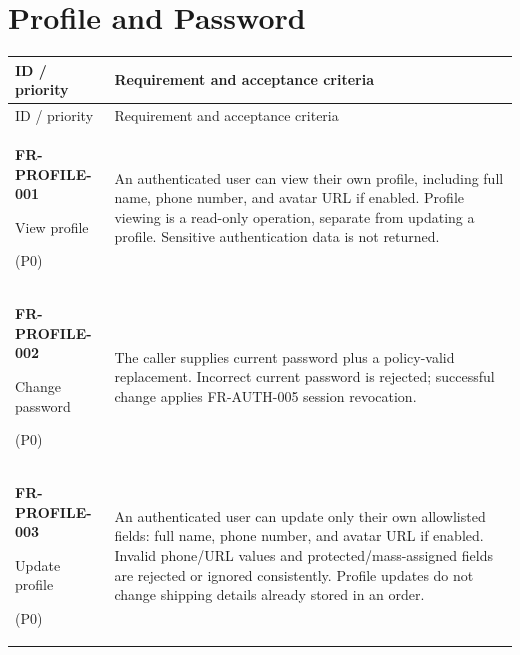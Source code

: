 \section{Profile and Password}
\begin{longtable}{@{}p{44mm}p{109mm}@{}}
\toprule
ID / priority & Requirement and acceptance criteria \\
\midrule
\endfirsthead
\toprule
ID / priority & Requirement and acceptance criteria \\
\midrule
\endhead
\textbf{FR-PROFILE-001}\par View profile\par (P0) & An authenticated user can view their own profile, including full name, phone number, and avatar URL if enabled. Profile viewing is a read-only operation, separate from updating a profile. Sensitive authentication data is not returned. \\
\textbf{FR-PROFILE-002}\par Change password\par (P0) & The caller supplies current password plus a policy-valid replacement. Incorrect current password is rejected; successful change applies FR-AUTH-005 session revocation. \\
\textbf{FR-PROFILE-003}\par Update profile\par (P0) & An authenticated user can update only their own allowlisted fields: full name, phone number, and avatar URL if enabled. Invalid phone/URL values and protected/mass-assigned fields are rejected or ignored consistently. Profile updates do not change shipping details already stored in an order. \\
\bottomrule
\end{longtable}

